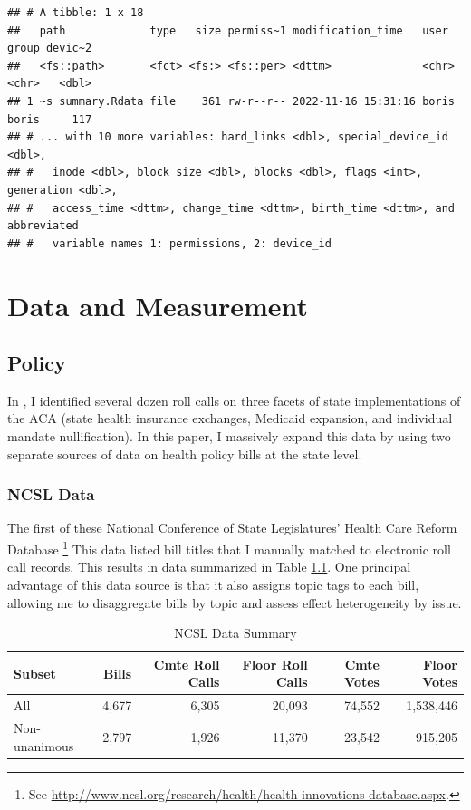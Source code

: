 \documentclass[
  oneside]{book}
\begin{document}
\begin{verbatim}
## # A tibble: 1 x 18
##   path             type   size permiss~1 modification_time   user  group devic~2
##   <fs::path>       <fct> <fs:> <fs::per> <dttm>              <chr> <chr>   <dbl>
## 1 ~s summary.Rdata file    361 rw-r--r-- 2022-11-16 15:31:16 boris boris     117
## # ... with 10 more variables: hard_links <dbl>, special_device_id <dbl>,
## #   inode <dbl>, block_size <dbl>, blocks <dbl>, flags <int>, generation <dbl>,
## #   access_time <dttm>, change_time <dttm>, birth_time <dttm>, and abbreviated
## #   variable names 1: permissions, 2: device_id
\end{verbatim}

\hypertarget{data-and-measurement}{%
\chapter{Data and Measurement}\label{data-and-measurement}}

\hypertarget{policy}{%
\section{Policy}\label{policy}}

In \citet{Shor:2018}, I identified several dozen roll calls on three facets of state implementations of the ACA (state health insurance exchanges, Medicaid expansion, and individual mandate nullification). In this paper, I massively expand this data by using two separate sources of data on health policy bills at the state level.

\hypertarget{ncsl-data}{%
\subsection{NCSL Data}\label{ncsl-data}}

The first of these National Conference of State Legislatures' Health Care Reform Database \footnote{See \url{http://www.ncsl.org/research/health/health-innovations-database.aspx}.} This data listed bill titles that I manually matched to electronic roll call records. This results in data summarized in Table \ref{tab:ncsl-summary}. One principal advantage of this data source is that it also assigns topic tags to each bill, allowing me to disaggregate bills by topic and assess effect heterogeneity by issue.

\begin{table}

\caption{\label{tab:ncsl-summary}NCSL Data Summary}
\centering
\begin{tabular}[t]{lrrrrr}
\toprule
Subset & Bills & Cmte Roll Calls & Floor Roll Calls & Cmte Votes & Floor Votes\\
\midrule
All & 4,677 & 6,305 & 20,093 & 74,552 & 1,538,446\\
Non-unanimous & 2,797 & 1,926 & 11,370 & 23,542 & 915,205\\
\bottomrule
\end{tabular}
\end{table}
\end{document}

